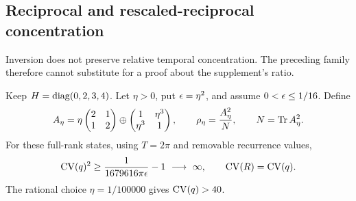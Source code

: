 \subsection{Reciprocal and rescaled-reciprocal concentration}
Inversion does not preserve relative temporal concentration. The preceding
family therefore cannot substitute for a proof about the supplement's
ratio.

\begin{theorem}\label{thm:reciprocal}
Keep $H=\operatorname{diag}(0,2,3,4)$. Let $\eta>0$, put $\epsilon=\eta^2$, and assume
$0<\epsilon\le1/16$. Define
\begin{equation}\label{eq:reciprocal-family}
 A_\eta=\eta\begin{pmatrix}2&1\\1&2\end{pmatrix}
 \oplus\begin{pmatrix}1&\eta^3\\\eta^3&1\end{pmatrix},
 \qquad \rho_\eta=\frac{A_\eta^2}{N},
 \qquad N=\operatorname{Tr} A_\eta^2.
\end{equation}
For these full-rank states, using $T=2\pi$ and removable recurrence values,
\begin{equation}\label{eq:reciprocal-cv}
 \operatorname{CV}(q)^2\ge\frac1{1679616\pi\epsilon}-1
 \ \longrightarrow\ \infty,\qquad \operatorname{CV}(R)=\operatorname{CV}(q).
\end{equation}
The rational choice $\eta=1/100000$ gives $\operatorname{CV}(q)>40$.
\end{theorem}
